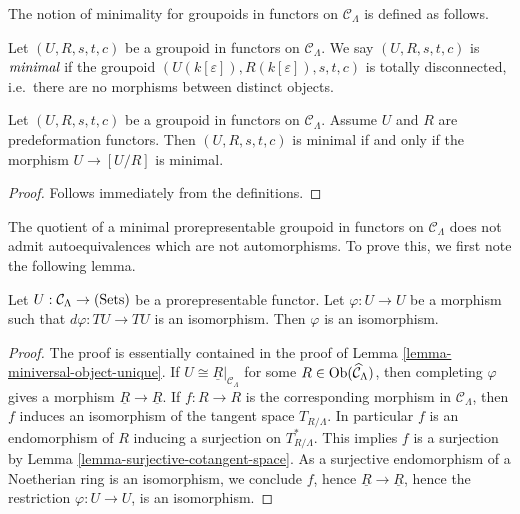 \noindent
The notion of minimality for groupoids in functors on $\mathcal C_{\Lambda}$ is 
defined as follows.
\begin{definition}
\label{definition-minimal-groupoid-in-functors}
Let $(U, R, s,t,c)$ be a groupoid in functors on $\mathcal C_{\Lambda}$.  We 
say $(U, R, s,t,c)$ is $\emph{minimal}$ if the groupoid 
$(U(k[\varepsilon]),R(k[\varepsilon]), s,t,c)$ is totally disconnected, i.e.\ 
there are no morphisms between distinct objects.
\end{definition}

\begin{lemma}
Let $(U, R, s,t,c)$ be a groupoid in functors on $\mathcal C_{\Lambda}$.  
Assume $U$ and $R$ are predeformation functors.  Then $(U,R,s,t,c)$ is minimal 
if and only if the morphism $U \rightarrow [U/R]$ is minimal.
\end{lemma}

\begin{proof}
Follows immediately from the definitions.
\end{proof}

\noindent
The quotient of a minimal prorepresentable groupoid in functors on $\mathcal 
C_{\Lambda}$ does not admit autoequivalences which are not automorphisms.  To 
prove this, we first note the following lemma.

\begin{lemma}
\label{lemma-surjective-morphism-prorepresentable-functor}
Let $U: \mathcal C_{\Lambda} \rightarrow \textnormal{(Sets)}$ be a 
prorepresentable functor.  Let $\varphi: U \rightarrow U$ be a morphism such 
that $d\varphi: TU \rightarrow TU$ is an isomorphism.  Then $\varphi$ is an 
isomorphism.
\end{lemma}

\begin{proof}
The proof is essentially contained in the proof of Lemma 
\ref{lemma-miniversal-object-unique}. If $U \cong \underline{R}|_{\mathcal 
C_{\Lambda}}$ for some $R \in \textnormal{Ob}(\widehat{\mathcal C}_{\Lambda})$, 
then completing $\varphi$ gives a morphism $\underline{R} \rightarrow 
\underline{R}$.  If $f: R \rightarrow R$ is the corresponding morphism in 
$\mathcal C_{\Lambda}$, then $f$ induces an isomorphism of the tangent space 
$T_{R/\Lambda}$.  In particular $f$ is an endomorphism of $R$ inducing a 
surjection on $T^*_{R/\Lambda}$.  This implies $f$ is a surjection by Lemma 
\ref{lemma-surjective-cotangent-space}. As a surjective endomorphism of a 
Noetherian ring is an isomorphism, we conclude $f$, hence $\underline{R} 
\rightarrow \underline{R}$, hence the restriction $\varphi: U \rightarrow U$, 
is an isomorphism.
\end{proof}

